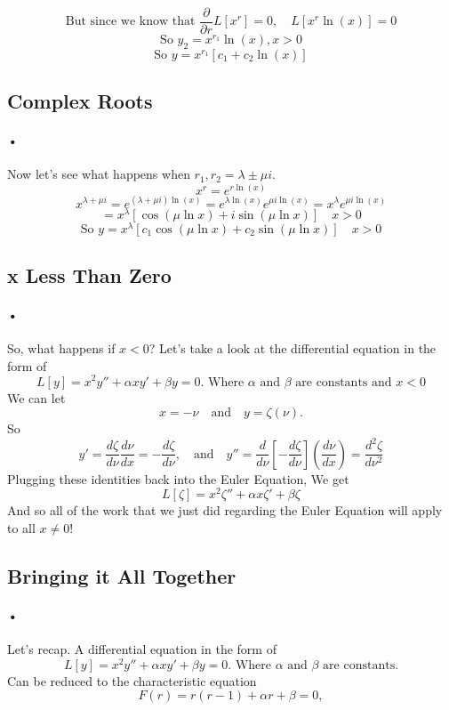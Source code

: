 \documentclass[font =22]{report}
\begin{document}
\[
\text{But since we know that } \frac{\partial}{\partial r}L[x^r] = 0, \quad  L[x^r \ln(x)]  = 0
\] 
\[
\text{So } y_2 = x^{r_1}\ln(x), x>0
\]
\[
\text{So } y = x^{r_1}[c_1 + c_2 \ln (x)]
\]
\subsection{Complex Roots}
\paragraph{•}
Now let's see what happens when $r_1,r_2 = \lambda \pm \mu i $.
\[
x^r = e^{r \ln (x)}
\]
\[
x^{ \lambda + \mu i} = e^{( \lambda + \mu i)\ln (x)} = e^{\lambda \ln (x)}e^{\mu i \ln (x)} = x^\lambda e^{\mu i \ln (x)}
\]
\[
= x^\lambda[\cos(\mu \ln x) + i \sin(\mu \ln x)]\quad  x> 0 
\]
\[
\text{So } y = x^\lambda[c_1\cos(\mu \ln x)+ c_2 \sin (\mu \ln x)]\quad x> 0 
\]
\subsection{x Less Than Zero}
\paragraph{•}
So, what happens if $x<0$? Let's take a look at the differential equation in the form of 
\[
L[y] = x^2y''+\alpha xy'+\beta y = 0. \text{ Where } \alpha \text{ and } \beta \text{ are constants and }x<0 
\]
We can let 
\[
  x = -\nu \quad \text{and} \quad y = \zeta(\nu).
\] 
So 
\[
y'=\frac{d \zeta}{d \nu}\frac{d\nu}{dx} = -\frac{d \zeta}{d\nu}, \quad \text{and} \quad y''= \frac{d}{d \nu}\left[-\frac{d \zeta}{d \nu}\right]\left( \frac{d \nu}{dx}  \right) = \frac{d^2\zeta}{d\nu^2}
\]
Plugging these identities back into the Euler Equation, We get 
\[
L[\zeta] = x^2\zeta '' + \alpha x \zeta ' + \beta \zeta
\] 
And so all of the work that we just did regarding the Euler Equation will apply to all $x\neq 0$! 
\subsection{Bringing it All Together}
\paragraph{•}
Let's recap. A differential equation in the form of 
\[
L[y] = x^2y''+\alpha xy'+\beta y = 0. \text{ Where } \alpha \text{ and } \beta \text{ are constants.}
\]
Can be reduced to the characteristic equation 
\[
 F(r) = r(r-1)+\alpha r + \beta= 0,
\]
\end{document}
